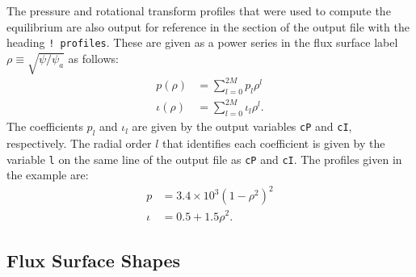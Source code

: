 \documentclass[10pt,a4paper]{article}
\begin{document}
The pressure and rotational transform profiles that were used to compute the equilibrium are also output for reference in the section of the output file with the heading \verb|! profiles|.  
These are given as a power series in the flux surface label $\rho \equiv \sqrt{\psi / \psi_a}$ as follows: 
%
\begin{subequations}
\begin{align}
p(\rho) &= \sum_{l=0}^{2M} p_{l} \rho^{l} \\
\iota(\rho) &= \sum_{l=0}^{2M} \iota_{l} \rho^{l}.
\end{align}
\end{subequations}
%
The coefficients $p_{l}$ and $\iota_{l}$ are given by the output variables \verb|cP| and \verb|cI|, respectively.  
The radial order $l$ that identifies each coefficient is given by the variable \verb|l| on the same line of the output file as \verb|cP| and \verb|cI|.  
The profiles given in the example are: 
%
\begin{subequations}
\begin{align*}
p &= 3.4\times10^3 (1-\rho^2)^2 \\
\iota &= 0.5 + 1.5 \rho^2.
\end{align*}
\end{subequations}

\subsection*{Flux Surface Shapes}
\end{document}
